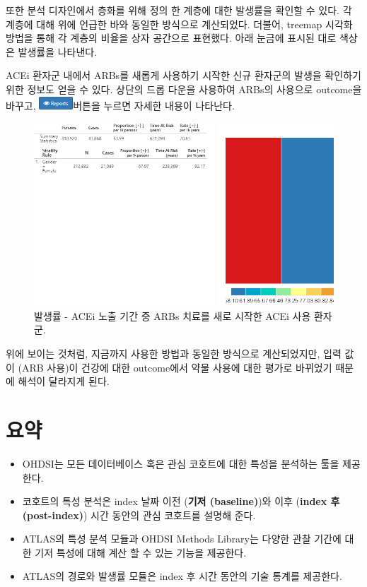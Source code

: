 \documentclass[11pt]{book}
\theoremstyle{definition}
\theoremstyle{definition}
\theoremstyle{definition}
\theoremstyle{remark}
\let\BeginKnitrBlock\begin \let\EndKnitrBlock\end
\begin{document}
또한 분석 디자인에서 층화를 위해 정의 한 계층에 대한 발생률을 확인할 수
있다. 각 계층에 대해 위에 언급한 바와 동일한 방식으로 계산되었다.
더불어, treemap 시각화 방법을 통해 각 계층의 비율을 상자 공간으로
표현했다. 아래 눈금에 표시된 대로 색상은 발생률을 나타낸다.

ACEi 환자군 내에서 ARBs를 새롭게 사용하기 시작한 신규 환자군의 발생을
확인하기 위한 정보도 얻을 수 있다. 상단의 드롭 다운을 사용하여 ARBs의
사용으로 outcome을 바꾸고,
\includegraphics{images/Characterization/atlasIncidenceReportButton.png}버튼을
누르면 자세한 내용이 나타난다.

\begin{figure}

{\centering \includegraphics[width=1\linewidth]{images/Characterization/atlasIncidenceResultsARB} 

}

\caption{발생률 - ACEi 노출 기간 중 ARBs 치료를 새로 시작한 ACEi 사용 환자군.}\label{fig:atlasIncidenceResultsARB}
\end{figure}

위에 보이는 것처럼, 지금까지 사용한 방법과 동일한 방식으로 계산되었지만,
입력 값이 (ARB 사용)이 건강에 대한 outcome에서 약물 사용에 대한 평가로
바뀌었기 때문에 해석이 달라지게 된다.

\section{요약}\label{-9}

\BeginKnitrBlock{rmdsummary}
\begin{itemize}
\item
  OHDSI는 모든 데이터베이스 혹은 관심 코호트에 대한 특성을 분석하는 툴을
  제공한다.
\item
  코호트의 특성 분석은 index 날짜 이전 (\textbf{기저 (baseline)})와 이후
  (\textbf{index 후 (post-index)}) 시간 동안의 관심 코호트를 설명해
  준다.
\item
  ATLAS의 특성 분석 모듈과 OHDSI Methods Library는 다양한 관찰 기간에
  대한 기저 특성에 대해 계산 할 수 있는 기능을 제공한다.
\item
  ATLAS의 경로와 발생률 모듈은 index 후 시간 동안의 기술 통계를
  제공한다.
\end{itemize}
\EndKnitrBlock{rmdsummary}
\end{document}
